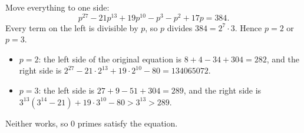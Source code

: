 Move everything to one side:
\[p^{27}-21p^{13}+19p^{10}-p^3-p^2+17p=384.\]
Every term on the left is divisible by $p$, so $p$ divides $384=2^7\cdot3$. Hence $p=2$ or $p=3$.
\begin{itemize}
\item $p=2$: the left side of the original equation is $8+4-34+304=282$, and the right side is $2^{27}-21\cdot2^{13}+19\cdot2^{10}-80=134065072$.
\item $p=3$: the left side is $27+9-51+304=289$, and the right side is $3^{13}\left(3^{14}-21\right)+19\cdot3^{10}-80>3^{13}>289$.
\end{itemize}
Neither works, so $\boxed{0}$ primes satisfy the equation.
